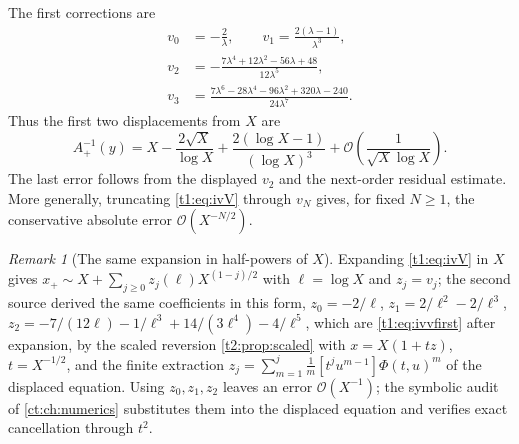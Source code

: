 \documentclass[11pt,openany]{book}
\numberwithin{equation}{chapter}
\theoremstyle{plain}
\theoremstyle{definition}
\theoremstyle{remark}
\newtheorem{remark}[theorem]{Remark}
\newcommand{\OO}{\mathcal O}\newcommand{\bigO}{\mathcal O}
\begin{document}
The first corrections are
\begin{align}
 v_0&=-\frac2\lambda,\qquad
 v_1=\frac{2(\lambda-1)}{\lambda^3},\nonumber\\
 v_2&=-\frac{7\lambda^4+12\lambda^2-56\lambda+48}{12\lambda^5},\label{t1:eq:ivvfirst}\\
 v_3&=\frac{7\lambda^6-28\lambda^4-96\lambda^2+320\lambda-240}{24\lambda^7}.
 \nonumber
\end{align}
Thus the first two displacements from $X$ are
\begin{equation}
 A_+^{-1}(y)=X-\frac{2\sqrt X}{\log X}
 +\frac{2(\log X-1)}{(\log X)^3}
 +\OO\!\left(\frac1{\sqrt X\log X}\right).
 \label{t1:eq:ivinvfirst}
\end{equation}
The last error follows from the displayed $v_2$ and the next-order residual estimate. More generally, truncating \eqref{t1:eq:ivV} through $v_N$ gives, for fixed $N\ge1$, the conservative absolute error $\OO(X^{-N/2})$.

\begin{remark}[The same expansion in half-powers of $X$]
\label{ct:rmk:zj}
Expanding \cref{t1:eq:ivV} in $X$ gives
$x_+\sim X+\sum_{j\ge0}z_j(\ell)X^{(1-j)/2}$ with $\ell=\log X$ and
$z_j=v_j$; the second source derived the same coefficients in this form,
$z_0=-2/\ell$, $z_1=2/\ell^2-2/\ell^3$,
$z_2=-7/(12\ell)-1/\ell^3+14/(3\ell^4)-4/\ell^5$, which are
\cref{t1:eq:ivvfirst} after expansion, by the scaled reversion
\cref{t2:prop:scaled} with $x=X(1+tz)$, $t=X^{-1/2}$, and the finite
extraction $z_j=\sum_{m=1}^{j}\frac1m[t^ju^{m-1}]\Phi(t,u)^m$ of the
displaced equation.  Using $z_0,z_1,z_2$ leaves an error $\bigO(X^{-1})$;
the symbolic audit of \cref{ct:ch:numerics} substitutes them into the
displaced equation and verifies exact cancellation through $t^2$.
\end{remark}

\end{document}
